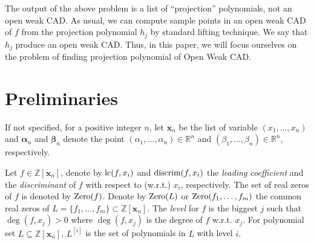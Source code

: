 \documentclass[amsthm]{elsart}
\def \discrim  {{\rm discrim}}
\def \lc  {{\rm lc}}
\def  \zero {{\rm Zero}}
\def \RR {{\mathbb R}}
\def \ZZ {{\mathbb Z}}
\newcommand{\va}{\bm{\alpha}}
\newcommand{\vb}{\bm{\beta}}
\newcommand{\xx}{\bm{x}}
\begin{document}
\begin{rem}
The output of the above problem is a list of ``projection'' polynomials, not an open weak CAD. As usual, we can compute sample points in an open weak CAD of $f$ from the projection polynomial $h_j$ by standard lifting technique. We say that $h_j$ produce an open weak CAD. Thus, in this paper, we will focus ourselves on the problem of finding projection polynomial of Open Weak CAD.
\end{rem}














\section{Preliminaries}\label{sec:pre}
If not specified, for a positive integer $n$, let $\xx_n$ be the list of variable $(x_1,\dots,x_n)$ and $\va_n$ and $\vb_n$ denote the point $(\alpha_1,\dots,\alpha_n)\in \RR^n$ and $(\beta_1,\dots,\beta_n)\in \RR^n$, respectively.





\begin{defn}
Let $f\in \ZZ[\xx_n]$, denote by $\lc(f,x_i)$ and $\discrim(f,x_i)$ the {\em leading coefficient} and the {\em discriminant} of $f$ with respect to (w.r.t.) $x_i$, respectively. The set of real zeros of $f$ is denoted by $\zero(f)$. Denote by $\zero(L)$ or $\zero(f_1,\ldots,f_m)$ the common real zeros of $L=\{f_1,\ldots,f_m\}\subset \ZZ[\xx_n].$
The {\em level} for $f$ is the biggest $j$ such that $\deg(f,{x_j})>0$ where $\deg(f,x_j)$ is the degree of $f$ w.r.t. $x_j$.
        For polynomial set $L\subseteq \ZZ[\xx_n]$, $L^{[i]}$ is the set of polynomials in $L$ with level $i$.
\end{defn} \begin{comment}
\begin{defn}
        Let $P_{n}$ be the symmetric permutation group of $x_1,\ldots,x_n$. Define $P_{n,i}$ to be the subgroup of $P_{n}$, where any element $\sigma$ of $P_{n,i}$ fixes $x_1,\ldots,x_{i-1}$, {\it i.e.}, $\sigma(x_j)=x_j$ for $j=1,\ldots,i-1$.
\end{defn}
\end{comment}
\end{document}
